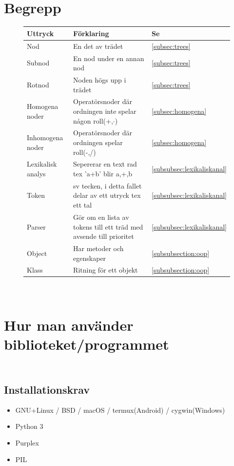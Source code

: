 \documentclass[12pt,a4paper]{article}
\begin{document}
\begin{appendices}
\section{\\Begrepp}
\begin{figure}[h!]
  \centering
  \begin{tabular}{l|l|l}
    \textbf{Uttryck} & \textbf{Förklaring} & \textbf{Se} \\
    \hline
    Nod & En det av trädet & \ref{subsec:trees} \\
    Subnod & En nod under en annan nod & \ref{subsec:trees} \\
    Rotnod & Noden högs upp i trädet & \ref{subsec:trees} \\
    Homogena noder & Operatörsnoder där ordningen inte spelar någon roll(+,\(\cdot\)) & \ref{subsec:homogena} \\
    Inhomogena noder & Operatörsnoder där ordningen spelar roll(-,/) & \ref{subsec:homogena} \\
    Lexikalisk analys & Sepererar en text rad tex 'a+b' blir a,+,b & \ref{subsubsec:lexikaliskanal} \\
    Token & sv tecken, i detta fallet delar av ett utryck tex ett tal & \ref{subsubsec:lexikaliskanal} \\
    Parser & Gör om en lista av tokens till ett träd med avsende till prioritet & \ref{subsubsec:lexikaliskanal} \\
    Object & Har metoder och egenskaper & \ref{subsubsection:oop} \\
    Klass & Ritning för ett objekt & \ref{subsubsection:oop} \\
  \end{tabular}
\end{figure}
\section{\\Hur man använder biblioteket/programmet}
\subsection{\\Installationskrav}
\begin{itemize}
  \item GNU+Linux / BSD / macOS / termux(Android) / cygwin(Windows)
  \item Python 3
  \item Purplex
  \item PIL
\end{itemize}

\end{appendices}
\end{document}

